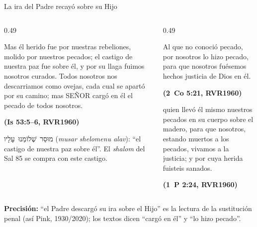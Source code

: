 \documentclass[hyperref={bookmarks=false},aspectratio=169]{beamer}
\newcommand{\heb}[1]{\mbox{\foreignlanguage{hebrew}{#1}}}
\newcommand{\SENOR}{S{\fontsize{0.78em}{1em}\selectfont EÑOR}}
\newcommand{\fuente}[1]{\par\hfill{\upshape\bfseries\footnotesize\textcolor{azul}{#1}}}
\newcommand{\precision}[1]{{\footnotesize\color{gris}\textbf{Precisión:} #1}}
\begin{document}
\begin{frame}{La ira del Padre recayó sobre su Hijo}
\begin{columns}[t,onlytextwidth]
\begin{column}{0.49\textwidth}
\begin{cita}Mas él herido fue por nuestras rebeliones, molido por nuestros pecados; el castigo de nuestra paz fue sobre él, y por su llaga fuimos nosotros curados. Todos nosotros nos descarriamos como ovejas, cada cual se apartó por su camino; mas \SENOR{} cargó en él el pecado de todos nosotros.\fuente{(Is 53:5--6, RVR1960)}\end{cita}
\scriptsize\heb{מוּסַר שְׁלוֹמֵנוּ עָלָיו} (\emph{musar shelomenu alav}): ``el castigo de nuestra paz sobre él''. El \emph{shalom} del Sal 85 se compra con este castigo.
\end{column}
\begin{column}{0.49\textwidth}
\begin{cita}Al que no conoció pecado, por nosotros lo hizo pecado, para que nosotros fuésemos hechos justicia de Dios en él.\fuente{(2~Co 5:21, RVR1960)}\end{cita}
\begin{cita}quien llevó él mismo nuestros pecados en su cuerpo sobre el madero, para que nosotros, estando muertos a los pecados, vivamos a la justicia; y por cuya herida fuisteis sanados.\fuente{(1~P 2:24, RVR1960)}\end{cita}
\end{column}
\end{columns}
\precision{``el Padre descargó su ira sobre el Hijo'' es la lectura de la sustitución penal (así Pink, 1930/2020); los textos dicen ``cargó en él'' y ``lo hizo pecado''.}
\end{frame}
\end{document}

